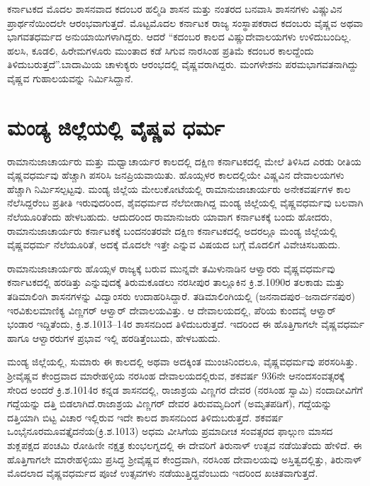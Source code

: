 ಕರ್ನಾಟಕದ ಮೊದಲ ಶಾಸನವಾದ ಕದಂಬರ ಹಲ್ಮಿಡಿ ಶಾಸನ ಮತ್ತು ನಂತರದ ಬನವಾಸಿ ಶಾಸನಗಳು ವಿಷ್ಣುವಿನ ಪ್ರಾರ್ಥನೆಯಿಂದಲೇ ಆರಂಭವಾಗುತ್ತದೆ. ಮೊಟ್ಟಮೊದಲ ಕರ್ನಾಟಕ ರಾಜ್ಯ ಸಂಸ್ಥಾಪಕರಾದ ಕದಂಬರು ವೈಷ್ಣವ ಅಥವಾ ಭಾಗವತಧರ್ಮದ ಅನುಯಾಯಿಗಳಾಗಿದ್ದರು. ಆದರೆ “ಕದಂಬರ ಕಾಲದ ವಿಷ್ಣುದೇವಾಲಯಗಳು ಉಳಿದುಬಂದಿಲ್ಲ. ಹಲಸಿ, ಕೂಡಲಿ, ಹಿರೇಮಗಳೂರು ಮುಂತಾದ ಕಡೆ ಸಿಗುವ ನಾರಸಿಂಹ ಪ್ರತಿಮೆ ಕದಂಬರ ಕಾಲದ್ದೆಂದು ತಿಳಿದುಬರುತ್ತದೆ”.ಬಾದಾಮಿಯ ಚಾಳುಕ್ಯರು ಆರಂಭದಲ್ಲಿ ವೈಷ್ಣವರಾಗಿದ್ದರು. ಮಂಗಳೇಶನು ಪರಮಭಾಗವತನಾಗಿದ್ದು ವೈಷ್ಣವ ಗುಹಾಲಯವನ್ನು ನಿರ್ಮಿಸಿದ್ದಾನೆ.


\section{ಮಂಡ್ಯ ಜಿಲ್ಲೆಯಲ್ಲಿ ವೈಷ್ಣವ ಧರ್ಮ}

ರಾಮಾನುಜಾಚಾರ್ಯರು ಮತ್ತು ಮಧ್ವಾಚಾರ್ಯರ ಕಾಲದಲ್ಲಿ ದಕ್ಷಿಣ ಕರ್ನಾಟಕದಲ್ಲಿ ಮೇಲೆ ತಿಳಿಸಿದ ಎರಡು ರೀತಿಯ ವೈಷ್ಣವಧರ್ಮವು ಹೆಚ್ಚಾಗಿ ಪಸರಿಸಿ ಜನಪ್ರಿಯವಾಯಿತು. ಹೊಯ್ಸಳರ ಕಾಲದಲ್ಲಿಯೇ ವಿಷ್ಣವಿನ ದೇವಾಲಯಗಳು ಹೆಚ್ಚಾಗಿ ನಿರ್ಮಿಸಲ್ಪಟ್ಟವು. ಮಂಡ್ಯ ಜಿಲ್ಲೆಯ ಮೇಲುಕೋಟೆಯಲ್ಲಿ ರಾಮಾನುಜಾಚಾರ್ಯರು ಅನೇಕವರ್ಷಗಳ ಕಾಲ ನೆಲೆಸಿದ್ದರೆಂಬ ಪ್ರತೀತಿ ಇರುವುದರಿಂದ, ಶೈವಧರ್ಮದ ನೆಲೆಬೀಡಾಗಿದ್ದ ಮಂಡ್ಯ ಜಿಲ್ಲೆಯಲ್ಲಿ ವೈಷ್ಣವಧರ್ಮವು ಬಲವಾಗಿ ನೆಲೆಯೂರಿತೆಂದು ಹೇಳಬಹುದು. ಆದುದರಿಂದ ರಾಮಾನುಜರು ಯಾವಾಗ ಕರ್ನಾಟಕಕ್ಕೆ ಬಂದು ಹೋದರು, ರಾಮಾನುಜಾಚಾರ್ಯರು ಕರ್ನಾಟಕಕ್ಕೆ ಬಂದನಂತರವೇ ದಕ್ಷಿಣ ಕರ್ನಾಟಕದಲ್ಲಿ ಅದರಲ್ಲೂ ಮಂಡ್ಯ ಜಿಲ್ಲೆಯಲ್ಲಿ ವೈಷ್ಣವಧರ್ಮ ನೆಲೆಯೂರಿತೆ, ಅದಕ್ಕೆ ಮೊದಲೇ ಇತ್ತೇ ಎನ್ನುವ ವಿಷಯದ ಬಗ್ಗೆ ಮೊದಲಿಗೆ ವಿವೇಚಿಸಬಹುದು.

ರಾಮಾನುಜಾಚಾರ್ಯರು ಹೊಯ್ಸಳ ರಾಜ್ಯಕ್ಕೆ ಬರುವ ಮುನ್ನವೇ ತಮಿಳುನಾಡಿನ ಆಳ್ವಾರರು ವೈಷ್ಣವಧರ್ಮವು ಕರ್ನಾಟಕದಲ್ಲಿ ಹರಡಿತ್ತು ಎನ್ನುವುದಕ್ಕೆ ತಿರುಮಕೂಡಲು ನರಸೀಪುರ ತಾಲ್ಲೂಕಿನ ಕ್ರಿ.ಶ.1090ರ ತಲಕಾಡು ಮತ್ತು ತಡಿಮಾಲಿಂಗಿ ಶಾಸನಗಳನ್ನು ವಿದ್ವಾಂಸರು ಉದಾಹರಿಸಿದ್ದಾರೆ. ತಡಿಮಾಲಿಂಗಿಯಲ್ಲಿ (ಜನನಾದಪುರ–ಜನಾರ್ದನಪುರ) ಇರವಿಕುಲಮಾಣಿಕ್ಯ ವಿಣ್ಣಗರ್​ ಆಳ್ವಾರ್​ ದೇವಾಲಯವಿತ್ತು. ಆ ದೇವಾಲಯದಲ್ಲಿ, ಪೆರಿಯ ಕುಂದವೈ ಆಳ್ವಾರ್​ ಭಂಡಾರ ಇದ್ದಿತೆಂದು, ಕ್ರಿ.ಶ.1013–14ರ ಶಾಸನದಿಂದ ತಿಳಿದುಬರುತ್ತದೆ. ಇದರಿಂದ ಈ ಹೊತ್ತಿಗಾಗಲೇ ವೈಷ್ಣವಧರ್ಮ ಹಾಗೂ ಆಳ್ವಾರರುಗಳ ಪ್ರಭಾವ ಇಲ್ಲಿ ಹರಡಿತ್ತೆಂಬುದು, ಹೇಳಬಹುದು.

ಮಂಡ್ಯ ಜಿಲ್ಲೆಯಲ್ಲಿ, ಸುಮಾರು ಈ ಕಾಲದಲ್ಲಿ ಅಥವಾ ಅದಕ್ಕಿಂತ ಮುಂಚಿನಿಂದಲೂ, ವೈಷ್ಣವಧರ್ಮವು ಪರಸರಿಸಿತ್ತು. ಶ‍್ರೀವೈಷ್ಣವ ಕೇಂದ್ರವಾದ ಮಾರೇಹಳ್ಳಿಯ ನರಸಿಂಹ ದೇವಾಲಯದಲ್ಲಿರುವ, ಶಕವರ್ಷ 936ನೇ ಆನಂದಸಂವತ್ಸರಕ್ಕೆ ಸೇರಿದ ಅಂದರೆ ಕ್ರಿ.ಶ.1014ರ ಕನ್ನಡ ಶಾಸನದಲ್ಲಿ, ರಾಜಾಶ್ರಯ ವಿಣ್ಣಗರ ದೇವರ (ನರಸಿಂಹ ಸ್ವಾಮಿ) ನಂದಾದೀವಿಗೆಗೆ ಗದ್ದೆಯನ್ನು ದತ್ತಿ ಬಿಡಲಾಗಿದೆ.ರಾಜಾಶ್ರಯ ವಿಣ್ಣಗರ್​ ದೇವರ ತಿರುವಮೃದಿಂಗೆ (ಅಮೃತಪಡಿಗೆ), ಗದ್ದೆಯನ್ನು ದತ್ತಿಯಾಗಿ ಬಿಟ್ಟ ವಿಚಾರ ಇಲ್ಲಿರುವ ಇದೇ ಕಾಲದ ಶಾಸನದಿಂದ ತಿಳಿದುಬರುತ್ತದೆ. ಶಕವರ್ಷ ಒಂಭೈನೂರಮೂವತ್ತೈದನೆಯ(ಕ್ರಿ.ಶ.1013) ಅಧಮ ವೀಸಿಗೆಯ ಪ್ರಮಾದೀಚ ಸಂವತ್ಸರದ ಫಾಲ್ಗುಣ ಮಾಸದ ಶುಕ್ಲಪಕ್ಷದ ಪಂಚಮಿ ರೋಹಿಣೀ ನಕ್ಷತ್ರ ಕುಂಭಲಗ್ನದಲ್ಲಿ ಈ ದೇವರಿಗೆ ತಿರುನಾಳ್​ ಉತ್ಸವ ನಡೆಯಿತೆಂದು ಹೇಳಿದೆ. ಈ ಹೊತ್ತಿಗಾಗಲೇ ಮಾರೇಹಳ್ಳಿಯು ಪ್ರಸಿದ್ಧ ಶ‍್ರೀವೈಷ್ಣವ ಕೇಂದ್ರವಾಗಿ, ನರಸಿಂಹ ದೇವಾಲಯವು ಅಸ್ತಿತ್ವದಲ್ಲಿತ್ತು, ತಿರುನಾಳ್​ ಮೊದಲಾದ ವೈಷ್ಣವಧರ್ಮದ ಪೂಜೆ ಉತ್ಸವಗಳು ನಡೆಯುತ್ತಿದ್ದವೆಂಬುದು ಇದರಿಂದ ಖಚಿತವಾಗುತ್ತದೆ.


